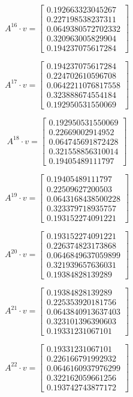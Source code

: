 \documentclass{article}
\begin{document}
$$A^{16} \cdot v = \begin{bmatrix}
0.192663323045267\\
0.227198538237311\\
0.0649380572702332\\
0.320963005829904\\
0.194237075617284
\end{bmatrix}
$$

$$A^{17} \cdot v = \begin{bmatrix}
0.194237075617284\\
0.224702610596708\\
0.0642211076817558\\
0.323888674554184\\
0.192950531550069
\end{bmatrix}
$$

$$A^{18} \cdot v = \begin{bmatrix}
0.192950531550069\\
0.22669002914952\\
0.064745691872428\\
0.321558856310014\\
0.19405489111797
\end{bmatrix}
$$

$$A^{19} \cdot v = \begin{bmatrix}
0.19405489111797\\
0.22509627200503\\
0.0643168438500228\\
0.323379718935757\\
0.193152274091221
\end{bmatrix}
$$

$$A^{20} \cdot v = \begin{bmatrix}
0.193152274091221\\
0.226374823173868\\
0.0646849637059899\\
0.321939657636031\\
0.19384828139289
\end{bmatrix}
$$

$$A^{21} \cdot v = \begin{bmatrix}
0.19384828139289\\
0.225353920181756\\
0.0643840913637403\\
0.323101396390603\\
0.19331231067101
\end{bmatrix}
$$

$$A^{22} \cdot v = \begin{bmatrix}
0.19331231067101\\
0.226166791992932\\
0.0646160937976299\\
0.322162059661256\\
0.193742743877172
\end{bmatrix}
$$
\end{document}
